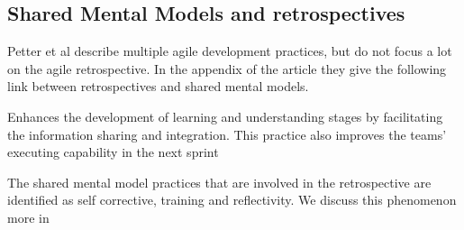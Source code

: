 	
\subsection{Shared Mental Models and retrospectives}

Petter et al\cite{Petter2013} describe multiple agile development practices, but do not focus a lot on the agile retrospective. In the appendix of the article they give the following link between retrospectives and shared mental models.

\begin{qoute}
Enhances the development of learning and understanding stages by facilitating the information sharing and integration. This practice also improves the teams’ executing capability in the next sprint
\end{qoute}

The shared mental model practices that are involved in the retrospective are identified as self corrective, training and reflectivity. We discuss this phenomenon more in  




\clearpage

